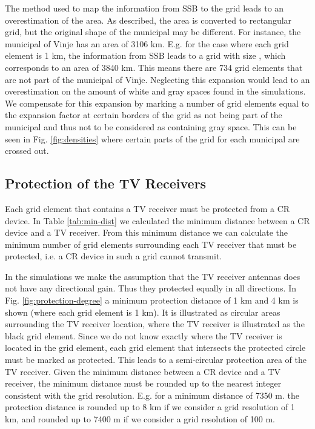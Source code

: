 \documentclass[journal,11pt,draftclsnofoot,onecolumn]{IEEEtran}
\begin{document}
The method used to map the information from SSB to the grid leads to an overestimation of the area. As described, the area is converted to rectangular  grid, but the original shape of the municipal may be different. For instance, the municipal of Vinje has an area of 3106 km. E.g. for the case where each grid element is 1 km, the information from SSB leads to a grid with size , which corresponds to an area of 3840 km. This means there are 734 grid elements that are not part of the municipal of Vinje. Neglecting this expansion would lead to an overestimation on the amount of white and gray spaces found in the simulations. We compensate for this expansion by marking a number of grid elements equal to the expansion factor at certain borders of the grid as not being part of the municipal and thus not to be considered as containing gray space. This can be seen in Fig. \ref{fig:densities} where certain parts of the grid for each municipal are crossed out.

\subsection{Protection of the TV Receivers}
Each grid element that contains a TV receiver must be protected from a CR device. In Table \ref{tab:min-dist} we calculated the minimum distance between a CR device and a TV receiver. From this minimum distance we can calculate the minimum number of grid elements surrounding each TV receiver that must be protected, i.e. a CR device in such a grid cannot transmit. 

In the simulations we make the assumption that the TV receiver antennas does not have any directional gain. Thus they protected equally in all directions. In Fig. \ref{fig:protection-degree} a minimum protection distance of 1 km and 4 km is shown (where each grid element is 1 km). It is illustrated as circular areas surrounding the TV receiver location, where the TV receiver is illustrated as the black grid element. Since we do not know exactly where the TV receiver is located in the grid element, each grid element that intersects the protected circle must be marked as protected. This leads to a semi-circular protection area of the TV receiver. Given the minimum distance between a CR device and a TV receiver, the minimum distance must be rounded up to the nearest integer consistent with the grid resolution. E.g. for a minimum distance of 7350 m. the protection distance is rounded up to 8 km if we consider a grid resolution of 1 km, and rounded up to 7400 m if we consider a grid resolution of 100 m.
\end{document}
